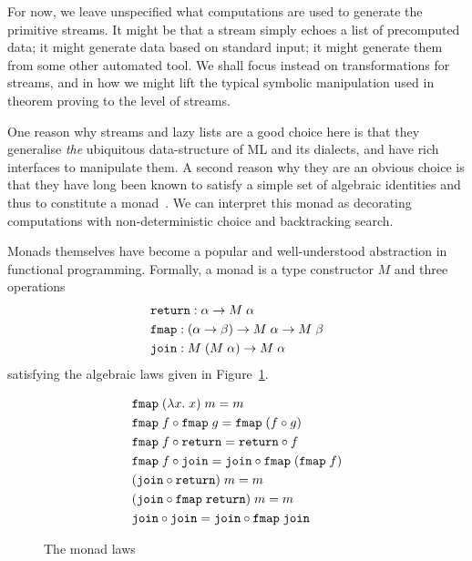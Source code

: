 For now, we leave unspecified what computations are used to generate the primitive streams. It might be that a stream simply echoes a list of precomputed data; it might generate data based on standard input; it might generate them from some other automated tool. We shall focus instead on transformations for streams, and in how we might lift the typical symbolic manipulation used in theorem proving to the level of streams.

One reason why streams and lazy lists are a good choice here is that they generalise \emph{the} ubiquitous data-structure of ML and its dialects, and have rich interfaces to manipulate them. A second reason why they are an obvious choice is that they have long been known to satisfy a simple set of algebraic identities and thus to constitute a monad~\cite{MonadWadler}. We can interpret this monad as decorating computations with non-deterministic choice and backtracking search.

Monads themselves have become a popular and well-understood abstraction in functional programming. Formally, a monad is a type constructor $M$ and three operations 
\begin{align*}
&\texttt{return} : \alpha \rightarrow M\;\alpha\\
&\texttt{fmap} : (\alpha \rightarrow \beta) \rightarrow M\;\alpha \rightarrow M\;\beta\\
&\texttt{join} : M\;(M\;\alpha) \rightarrow M\;\alpha
\end{align*}
satisfying the algebraic laws given in Figure~\ref{fig:MonadLaws}.

\begin{figure}
\begin{align}
&\texttt{fmap}\;(\lambda x.\;x)\;m = m\notag\\
&\texttt{fmap}\;f \circ \texttt{fmap}\;g = \texttt{fmap}\;(f \circ g)\notag\\
&\texttt{fmap}\;f \circ \texttt{return} = \texttt{return}\circ f\notag\\
&\texttt{fmap}\;f \circ \texttt{join} = \texttt{join} \circ \texttt{fmap}\;(\texttt{fmap}\;f)\notag\\
&(\texttt{join} \circ \texttt{return})\;m = m\notag\\
&(\texttt{join} \circ \texttt{fmap}\;\texttt{return})\;m = m\notag\\
&\texttt{join} \circ \texttt{join} = \texttt{join} \circ \texttt{fmap}\;\texttt{join} \label{eq:JoinAssoc}
\end{align}
\caption{The monad laws}
\label{fig:MonadLaws}
\end{figure}

